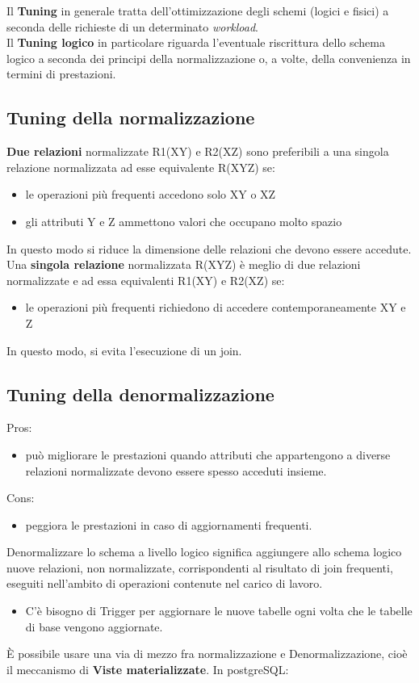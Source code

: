 Il \textbf{Tuning} in generale tratta dell'ottimizzazione degli schemi (logici e fisici) a seconda delle richieste di un determinato \textit{workload}.\\
Il \textbf{Tuning logico} in particolare riguarda l'eventuale riscrittura dello schema logico a seconda dei principi della normalizzazione o, a volte, della convenienza in termini di prestazioni.

\subsection{Tuning della normalizzazione}
\textbf{Due relazioni} normalizzate R1(XY) e R2(XZ) sono preferibili a una singola relazione normalizzata ad esse equivalente R(XYZ) se:
\begin{itemize}
    \item le operazioni più frequenti accedono solo XY o XZ
    \item gli attributi Y e Z ammettono valori che occupano molto spazio
\end{itemize}
In questo modo si riduce la dimensione delle relazioni che devono essere accedute.\vspace{2mm} \\
Una \textbf{singola relazione} normalizzata R(XYZ) è meglio di due relazioni normalizzate e ad essa equivalenti R1(XY) e R2(XZ) se:
\begin{itemize}
    \item le operazioni più frequenti richiedono di accedere contemporaneamente XY e Z
\end{itemize}
In questo modo, si evita l’esecuzione di un join.

\subsection{Tuning della denormalizzazione}
Pros:
\begin{itemize}
    \item può migliorare le prestazioni quando attributi che appartengono a diverse relazioni normalizzate devono essere spesso acceduti insieme.
\end{itemize}
Cons:
\begin{itemize}
    \item peggiora le prestazioni in caso di aggiornamenti frequenti.
\end{itemize}
Denormalizzare lo schema a livello logico significa aggiungere allo schema logico nuove relazioni, non normalizzate, corrispondenti al risultato di join frequenti, eseguiti nell’ambito di operazioni contenute nel carico di lavoro.
\begin{itemize}
    \item C'\`e bisogno di Trigger per aggiornare le nuove tabelle ogni volta che le tabelle di base vengono aggiornate.
\end{itemize}
\vspace{4mm}
\`E possibile usare una via di mezzo fra normalizzazione e Denormalizzazione, cioè il meccanismo di \textbf{Viste materializzate}. In postgreSQL:\vspace{2mm}\\

